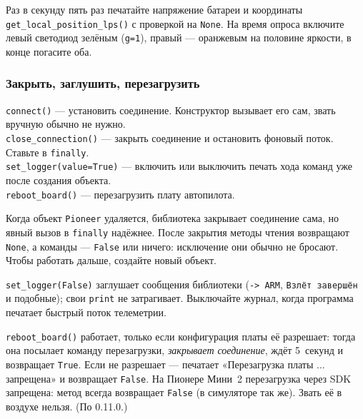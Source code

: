 \begin{taskbox}
Раз в секунду пять раз печатайте напряжение батареи и координаты \verb|get_local_position_lps()| с проверкой на \verb|None|. На время опроса включите левый светодиод зелёным (\verb|g=1|), правый --- оранжевым на половине яркости, в конце погасите оба.
\end{taskbox}

\subsubsection*{Закрыть, заглушить, перезагрузить}

\begin{codebox}
\verb|connect()| --- установить соединение. Конструктор вызывает его сам, звать вручную обычно не нужно.\\
\verb|close_connection()| --- закрыть соединение и остановить фоновый поток. Ставьте в \verb|finally|.\\
\verb|set_logger(value=True)| --- включить или выключить печать хода команд уже после создания объекта.\\
\verb|reboot_board()| --- перезагрузить плату автопилота.
\end{codebox}

Когда объект \verb|Pioneer| удаляется, библиотека закрывает соединение сама, но явный вызов в \verb|finally| надёжнее. После закрытия методы чтения возвращают \verb|None|, а команды --- \verb|False| или ничего: исключение они обычно не бросают. Чтобы работать дальше, создайте новый объект.

\verb|set_logger(False)| заглушает сообщения библиотеки (\texttt{-> ARM}, \texttt{Взлёт завершён} и подобные); свои \verb|print| не затрагивает. Выключайте журнал, когда программа печатает быстрый поток телеметрии.

\begin{warnbox}
\verb|reboot_board()| работает, только если конфигурация платы её разрешает: тогда она посылает команду перезагрузки, \emph{закрывает соединение}, ждёт 5~секунд и возвращает \verb|True|. Если не разрешает --- печатает «Перезагрузка платы ... запрещена» и возвращает \verb|False|. На Пионере Мини~2 перезагрузка через SDK запрещена: метод всегда возвращает \verb|False| (в симуляторе так же). Звать её в воздухе нельзя. (По 0.11.0.)
\end{warnbox}

